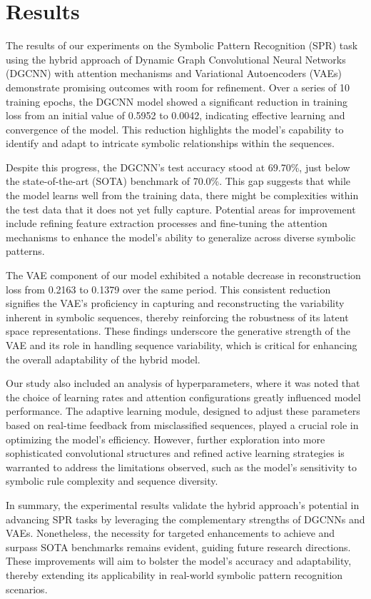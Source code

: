 \documentclass{article}
\begin{document}
\section{Results}
The results of our experiments on the Symbolic Pattern Recognition (SPR) task using the hybrid approach of Dynamic Graph Convolutional Neural Networks (DGCNN) with attention mechanisms and Variational Autoencoders (VAEs) demonstrate promising outcomes with room for refinement. Over a series of 10 training epochs, the DGCNN model showed a significant reduction in training loss from an initial value of 0.5952 to 0.0042, indicating effective learning and convergence of the model. This reduction highlights the model's capability to identify and adapt to intricate symbolic relationships within the sequences.

Despite this progress, the DGCNN's test accuracy stood at 69.70\%, just below the state-of-the-art (SOTA) benchmark of 70.0\%. This gap suggests that while the model learns well from the training data, there might be complexities within the test data that it does not yet fully capture. Potential areas for improvement include refining feature extraction processes and fine-tuning the attention mechanisms to enhance the model's ability to generalize across diverse symbolic patterns.

The VAE component of our model exhibited a notable decrease in reconstruction loss from 0.2163 to 0.1379 over the same period. This consistent reduction signifies the VAE's proficiency in capturing and reconstructing the variability inherent in symbolic sequences, thereby reinforcing the robustness of its latent space representations. These findings underscore the generative strength of the VAE and its role in handling sequence variability, which is critical for enhancing the overall adaptability of the hybrid model.

Our study also included an analysis of hyperparameters, where it was noted that the choice of learning rates and attention configurations greatly influenced model performance. The adaptive learning module, designed to adjust these parameters based on real-time feedback from misclassified sequences, played a crucial role in optimizing the model's efficiency. However, further exploration into more sophisticated convolutional structures and refined active learning strategies is warranted to address the limitations observed, such as the model's sensitivity to symbolic rule complexity and sequence diversity.

In summary, the experimental results validate the hybrid approach's potential in advancing SPR tasks by leveraging the complementary strengths of DGCNNs and VAEs. Nonetheless, the necessity for targeted enhancements to achieve and surpass SOTA benchmarks remains evident, guiding future research directions. These improvements will aim to bolster the model's accuracy and adaptability, thereby extending its applicability in real-world symbolic pattern recognition scenarios.
\end{document}
